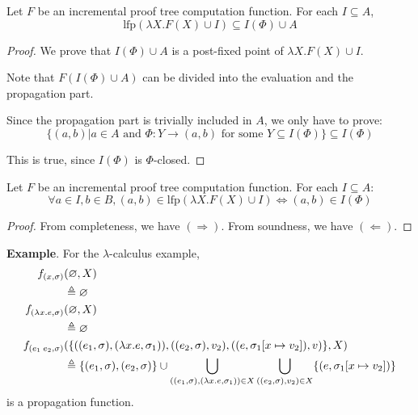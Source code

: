 \documentclass[12pt]{article}
\begin{document}
\begin{theorem}[Completeness]
	Let $F$ be an incremental proof tree computation function.
	For each $I\subseteq A$,
	\[\text{lfp}(\lambda X.F(X)\cup I)\subseteq I(\Phi)\cup A\]
\end{theorem}
\begin{proof}
	We prove that $I(\Phi)\cup A$ is a post-fixed point of $\lambda X.F(X)\cup I$.

	Note that $F(I(\Phi)\cup A)$ can be divided into the evaluation and the propagation part.

	Since the propagation part is trivially included in $A$, we only have to prove:
	\[\{(a,b)|a\in A\text{ and }\Phi:Y\rightarrow(a,b)\text{ for some }Y\subseteq I(\Phi)\}\subseteq I(\Phi)\]

	This is true, since $I(\Phi)$ is $\Phi$-closed.
\end{proof}

\begin{corollary}
	Let $F$ be an incremental proof tree computation function.
	For each $I\subseteq A$:
	\[\forall a\in I, b\in B, (a,b)\in\text{lfp}(\lambda X.F(X)\cup I)\Leftrightarrow (a,b)\in I(\Phi)\]
\end{corollary}
\begin{proof}
	From completeness, we have $(\Rightarrow)$. From soundness, we have $(\Leftarrow)$.
\end{proof}
\noindent\textbf{Example}. For the $\lambda$-calculus example,
\begin{align*}
	f_{(x,\sigma)}           & (\varnothing,X)                                                                                                                                            \\
	                         & \triangleq\varnothing                                                                                                                                          \\
	f_{(\lambda x.e,\sigma)} & (\varnothing,X)                                                                                                                                            \\
	                         & \triangleq\varnothing                                                                                                                                          \\
	f_{(e_1\:e_2,\sigma)}    & (\{((e_1,\sigma),(\lambda x.e,\sigma_1)),((e_2,\sigma),v_2),((e,\sigma_1[x\mapsto v_2]),v)\},X)                                                            \\
	                         & \triangleq\{(e_1,\sigma),(e_2,\sigma)\}\cup\bigcup_{((e_1,\sigma),(\lambda x.e,\sigma_1))\in X}\bigcup_{((e_2,\sigma),v_2)\in X}\{(e,\sigma_1[x\mapsto v_2])\}
\end{align*}
is a propagation function.
\end{document}
